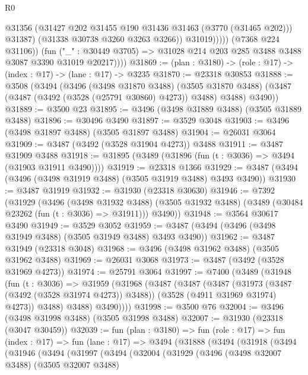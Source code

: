 \begin{lexlean}{R0}
\begin{coremodule}
                          @31356
                          (@31427 @202 @31455 @190 @31436 @31463 (@3770 (@31465 @202)))
                          @31387)
                        (@31338 @30738 @3260 @3263 @3266))
                      @31019)))))
            (@7368 @224 @31106))
          (fun ("_" : @30449 @3705) =>
          @31028 @214 @203 @285 @3488 @3488 @3087 @3390 @31019 @20217))))
@31869 := (plan : @3180) -> (role : @17) -> (index : @17) -> (lane : @17) -> @3235
@31870 := @23318 @30853
@31888 := @3508
    (@3494
      (@3496
        (@3498 @31870 @3488)
        (@3505 @31870 @3488)
        (@3487 (@3487 (@3492 (@3528 (@25791 @30860) @4273)) @3488) @3488)
        @3490))
@31889 := @3500 @23
@31895 := @3496 (@3498 @31889 @3488) (@3505 @31889 @3488)
@31896 := @30496 @3490
@31897 := @3529 @3048
@31903 := @3496 (@3498 @31897 @3488) (@3505 @31897 @3488)
@31904 := @26031 @3064
@31909 := @3487 (@3492 (@3528 @31904 @4273)) @3488
@31911 := @3487 @31909 @3488
@31918 := @31895 (@3489 (@31896 (fun (t : @3036) => @3494 (@31903 @31911 @3490))))
@31919 := @23318 @1366
@31929 := @3487 (@3494 (@3496 (@3498 @31919 @3488) (@3505 @31919 @3488) @3493 @3490))
@31930 := @3487 @31919
@31932 := @31930 (@23318 @30630)
@31946 := @7392
    (@31929
      (@3496
        (@3498 @31932 @3488)
        (@3505 @31932 @3488)
        (@3489 (@30484 @23262 (fun (t : @3036) => @31911)))
        @3490))
@31948 := @3564 @30617 @3490
@31949 := @3529 @3052
@31959 := @3487 (@3494 (@3496 (@3498 @31949 @3488) (@3505 @31949 @3488) @3493 @3490))
@31962 := @3487 @31949 (@23318 @3048)
@31968 := @3496 (@3498 @31962 @3488) (@3505 @31962 @3488)
@31969 := @26031 @3068
@31973 := @3487 (@3492 (@3528 @31969 @4273))
@31974 := @25791 @3064
@31997 := @7400
    (@3489
      (@31948
        (fun (t : @3036) =>
        @31959
          (@31968
            (@3487
              (@3487
                (@3487
                  (@31973 (@3487 (@3492 (@3528 @31974 @4273)) @3488))
                  (@3528 (@4911 @31969 @31974) @4273))
                @3488)
              @3488)
            @3490))))
@31998 := @3500 @76
@32004 := @3496 (@3498 @31998 @3488) (@3505 @31998 @3488)
@32007 := @31930 (@23318 (@3047 @30459))
@32039 := fun (plan : @3180) =>
  fun (role : @17) =>
  fun (index : @17) =>
  fun (lane : @17) =>
  @3494
    (@31888
      (@3494
        (@31918
          (@3494
            (@31946
              (@3494
                (@31997
                  (@3494
                    (@32004
                      (@31929
                        (@3496
                          (@3498 @32007 @3488)
                          (@3505 @32007 @3488)

\end{coremodule}
\end{lexlean}
